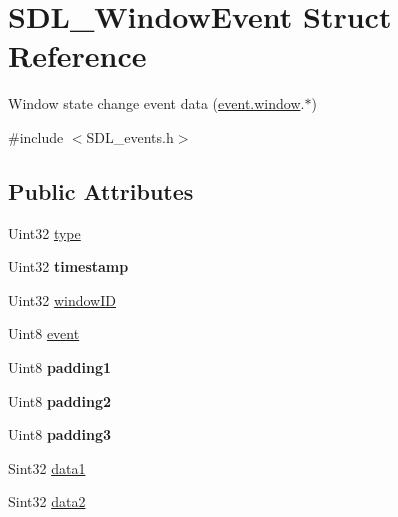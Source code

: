 \hypertarget{structSDL__WindowEvent}{\section{S\+D\+L\+\_\+\+Window\+Event Struct Reference}
\label{structSDL__WindowEvent}
}


Window state change event data (\hyperlink{unionSDL__Event_a826936b3275406d857bc6654669fae71}{event.\+window}.$\ast$)  




{\ttfamily \#include $<$S\+D\+L\+\_\+events.\+h$>$}

\subsection*{Public Attributes}
\begin{DoxyCompactItemize}
\item 
Uint32 \hyperlink{structSDL__WindowEvent_a01c8c8fbe8564e690f958d2db560f657}{type}
\item 
\hypertarget{structSDL__WindowEvent_a7b0bf569b20cfa4e3fb76e3301d616f9}{Uint32 {\bfseries timestamp}}\label{structSDL__WindowEvent_a7b0bf569b20cfa4e3fb76e3301d616f9}

\item 
Uint32 \hyperlink{structSDL__WindowEvent_a4b31796ffc84fbb7f6e9ba33e127619a}{window\+I\+D}
\item 
Uint8 \hyperlink{structSDL__WindowEvent_a485cd1f07f0f22fdb9f4c4bf214011dc}{event}
\item 
\hypertarget{structSDL__WindowEvent_a09ee59114246eceed4a281033ec6609b}{Uint8 {\bfseries padding1}}\label{structSDL__WindowEvent_a09ee59114246eceed4a281033ec6609b}

\item 
\hypertarget{structSDL__WindowEvent_a6bcf773b690b894e8c04c591826d0c8a}{Uint8 {\bfseries padding2}}\label{structSDL__WindowEvent_a6bcf773b690b894e8c04c591826d0c8a}

\item 
\hypertarget{structSDL__WindowEvent_ac352263b5fa4ba6dbd64a48062d5e29f}{Uint8 {\bfseries padding3}}\label{structSDL__WindowEvent_ac352263b5fa4ba6dbd64a48062d5e29f}

\item 
Sint32 \hyperlink{structSDL__WindowEvent_a01da0025428d3434c80021f3e4089fec}{data1}
\item 
Sint32 \hyperlink{structSDL__WindowEvent_af6cd0a21bc9ecadfee42f6a0147d7171}{data2}
\end{DoxyCompactItemize}


